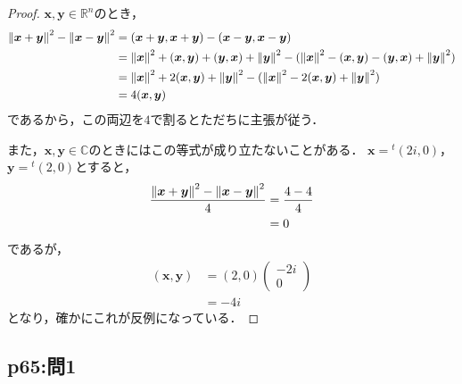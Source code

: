 \documentclass[uplatex,dvipdfmx,a4paper,11pt,fleqn]{jsarticle}
\begin{document}
\begin{tleftbar}
    \begin{proof}
        $\bm{x},\bm{y} \in \mathbb{R}^n$のとき，
        \begin{align*} 
            \norm{\bm{x}+\bm{y}}^2 - \norm{\bm{x}-\bm{y}}^2 & = (\bm{x}+\bm{y},\bm{x}+\bm{y}) - (\bm{x}-\bm{y},\bm{x}-\bm{y}) \\
            & = \norm{\bm{x}}^2 +(\bm{x},\bm{y})+(\bm{y},\bm{x})+ \norm{\bm{y}}^2 - (\norm{\bm{x}}^2 -(\bm{x},\bm{y})-(\bm{y},\bm{x})+\norm{\bm{y}}^2) \\
            & = \norm{\bm{x}}^2 + 2(\bm{x},\bm{y}) + \norm{\bm{y}}^2 - (\norm{\bm{x}}^2 - 2(\bm{x},\bm{y}) + \norm{\bm{y}}^2) \\
            & = 4(\bm{x},\bm{y})
        \end{align*}
        であるから，この両辺を$4$で割るとただちに主張が従う．
        
        また，$\bm{x},\bm{y} \in \mathbb{C}$のときにはこの等式が成り立たないことがある．
        $\bm{x}={}^t (2i,0)$，$\bm{y}={}^t (2,0)$とすると，
        \begin{align*}
        \frac{\norm{\bm{x}+\bm{y}}^2 - \norm{\bm{x}-\bm{y}}^2 }{4} &= \frac{4-4}{4} \\
        & =0
        \end{align*}
        であるが，
        \begin{align*}
        (\bm{x},\bm{y})& =(2,0) \begin{pmatrix} -2i  \\ 0 \end{pmatrix} \\
        &= -4i
        \end{align*}
        となり，確かにこれが反例になっている．
        \end{proof}
    \end{tleftbar}

    \newpage 

    \subsection*{p65:問1}
\end{document}
